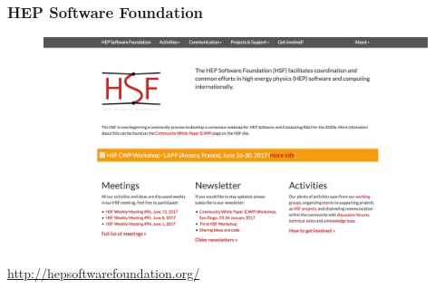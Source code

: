 \begin{frame}
\frametitle{HEP Software Foundation} 

\begin{figure}[htbp]
\begin{center}
\includegraphics[width=1.0\textwidth]{images/20170621-hsf-website.png}
\end{center}
\end{figure}

\small{\url{http://hepsoftwarefoundation.org/}}

\end{frame}


